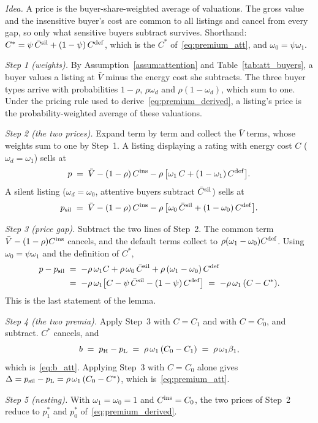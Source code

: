 \upshape
\emph{Idea.} A price is the buyer-share-weighted average of valuations. The gross value and the insensitive buyer's cost are common to all listings and cancel from every gap, so only what sensitive buyers subtract survives. Shorthand: $C^*=\psi\,\bar C^{\rm sil}+(1-\psi)\,C^{\rm def}$, which is the $C^*$ of~\eqref{eq:premium_att}, and $\omega_0=\psi\omega_1$.

\emph{Step 1 (weights).} By Assumption~\ref{assum:attention} and Table~\ref{tab:att_buyers}, a buyer values a listing at $\bar V$ minus the energy cost she subtracts. The three buyer types arrive with probabilities $1-\rho$, $\rho\omega_d$ and $\rho(1-\omega_d)$, which sum to one. Under the pricing rule used to derive~\eqref{eq:premium_derived}, a listing's price is the probability-weighted average of these valuations.

\emph{Step 2 (the two prices).} Expand term by term and collect the $\bar V$ terms, whose weights sum to one by Step~1. A listing displaying a rating with energy cost $C$ ($\omega_d=\omega_1$) sells at
\begin{equation*}
    p\;=\;\bar V-(1-\rho)\,C^{\rm ins}-\rho\,\big[\omega_1\,C+(1-\omega_1)\,C^{\rm def}\big].
\end{equation*}
A silent listing ($\omega_d=\omega_0$, attentive buyers subtract $\bar C^{\rm sil}$) sells at
\begin{equation*}
    p_{\rm sil}\;=\;\bar V-(1-\rho)\,C^{\rm ins}-\rho\,\big[\omega_0\,\bar C^{\rm sil}+(1-\omega_0)\,C^{\rm def}\big].
\end{equation*}

\emph{Step 3 (price gap).} Subtract the two lines of Step~2. The common term $\bar V-(1-\rho)C^{\rm ins}$ cancels, and the default terms collect to $\rho(\omega_1-\omega_0)C^{\rm def}$. Using $\omega_0=\psi\omega_1$ and the definition of $C^*$,
\begin{align*}
    p-p_{\rm sil}
    &\;=\;-\rho\,\omega_1C+\rho\,\omega_0\,\bar C^{\rm sil}+\rho\,(\omega_1-\omega_0)\,C^{\rm def}\\
    &\;=\;-\rho\,\omega_1\big[C-\psi\,\bar C^{\rm sil}-(1-\psi)\,C^{\rm def}\big]\;=\;-\rho\,\omega_1\,(C-C^*).
\end{align*}
This is the last statement of the lemma.

\emph{Step 4 (the two premia).} Apply Step~3 with $C=C_1$ and with $C=C_0$, and subtract. $C^*$ cancels, and
\begin{equation*}
    b\;=\;p_{\rm H}-p_{\rm L}\;=\;\rho\,\omega_1\,(C_0-C_1)\;=\;\rho\,\omega_1\beta_1,
\end{equation*}
which is~\eqref{eq:b_att}. Applying Step~3 with $C=C_0$ alone gives $\Delta=p_{\rm sil}-p_{\rm L}=\rho\,\omega_1\,(C_0-C^*)$, which is~\eqref{eq:premium_att}.

\emph{Step 5 (nesting).} With $\omega_1=\omega_0=1$ and $C^{\rm ins}=C_0$, the two prices of Step~2 reduce to $p_1^*$ and $p_0^*$ of~\eqref{eq:premium_derived}.
